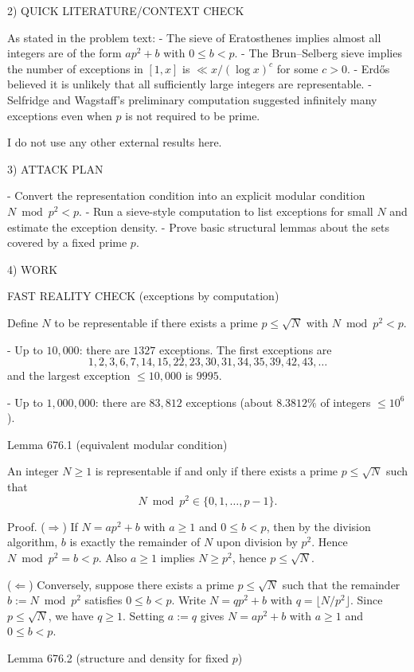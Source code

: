 2) QUICK LITERATURE/CONTEXT CHECK

As stated in the problem text:
- The sieve of Eratosthenes implies almost all integers are of the form $ap^2+b$ with $0\le b<p$.
- The Brun--Selberg sieve implies the number of exceptions in $[1,x]$ is $\ll x/(\log x)^c$ for some $c>0$.
- Erd\H{o}s believed it is unlikely that all sufficiently large integers are representable.
- Selfridge and Wagstaff's preliminary computation suggested infinitely many exceptions even when $p$ is not required to be prime.

I do not use any other external results here.

3) ATTACK PLAN

- Convert the representation condition into an explicit modular condition $N\bmod p^2<p$.
- Run a sieve-style computation to list exceptions for small $N$ and estimate the exception density.
- Prove basic structural lemmas about the sets covered by a fixed prime $p$.

4) WORK

FAST REALITY CHECK (exceptions by computation)

Define $N$ to be representable if there exists a prime $p\le\sqrt N$ with $N\bmod p^2<p$.

- Up to $10{,}000$: there are $1327$ exceptions. The first exceptions are
\[
1,2,3,6,7,14,15,22,23,30,31,34,35,39,42,43,\dots
\]
and the largest exception $\le 10{,}000$ is $9995$.

- Up to $1{,}000{,}000$: there are $83{,}812$ exceptions (about $8.3812\%$ of integers $\le 10^6$).

Lemma 676.1 (equivalent modular condition)

An integer $N\ge 1$ is representable if and only if there exists a prime $p\le\sqrt N$ such that
\[
 N\bmod p^2 \in \{0,1,\dots,p-1\}.
\]

Proof.
($\Rightarrow$) If $N=ap^2+b$ with $a\ge 1$ and $0\le b<p$, then by the division algorithm, $b$ is exactly the remainder of $N$ upon division by $p^2$. Hence $N\bmod p^2=b<p$.
Also $a\ge 1$ implies $N\ge p^2$, hence $p\le\sqrt N$.

($\Leftarrow$) Conversely, suppose there exists a prime $p\le\sqrt N$ such that the remainder $b:=N\bmod p^2$ satisfies $0\le b<p$. Write $N=qp^2+b$ with $q=\lfloor N/p^2\rfloor$. Since $p\le\sqrt N$, we have $q\ge 1$. Setting $a:=q$ gives $N=ap^2+b$ with $a\ge 1$ and $0\le b<p$.


Lemma 676.2 (structure and density for fixed $p$)

